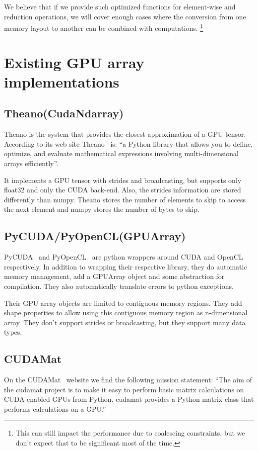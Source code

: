 \documentclass{article} %
\begin{document}
We believe that if we provide such optimized functions for element-wise and reduction operations, we will cover enough cases where the conversion from one memory layout to another can be combined with computations.
\footnote{This can still impact the performance due to coalescing constraints, but we don't expect that to be significant most of the time.}

\section{Existing GPU array implementations}
\subsection{Theano(CudaNdarray)}
Theano is the system that provides the closest approximation of a GPU tensor. 
According to its web site Theano~\citep{bergstra+al:2010-scipy} is: ``a Python library that allows you to define, optimize, and evaluate mathematical expressions involving multi-dimensional arrays efficiently''.

It implements a GPU tensor with strides and broadcasting, but supports only float32 and only the CUDA back-end.
Also, the strides information are stored differently than numpy.
Theano stores the number of elements to skip to access the next element and numpy stores the number of bytes to skip.

\subsection{PyCUDA/PyOpenCL(GPUArray)}
PyCUDA~\citep{kloeckner_pycuda_2009} and PyOpenCL~\citep{kloeckner_pycuda_2009} are python wrappers around CUDA and OpenCL respectively. 
In addition to wrapping their respective library, they do automatic memory management, add a GPUArray object and some abstraction for compilation. 
They also automatically translate errors to python exceptions.

Their GPU array objects are limited to contiguous memory regions.
They add shape properties to allow using this contiguous memory region as n-dimensional array.
They don't support strides or broadcasting, but they support many data types.

\subsection{CUDAMat}
On the CUDAMat~\citep{cudamat-TR2009} website we find the following mission statement: ``The aim of the cudamat project is to make it easy to perform basic matrix calculations on CUDA-enabled GPUs from Python. cudamat provides a Python matrix class that performs calculations on a GPU.''
\end{document}
